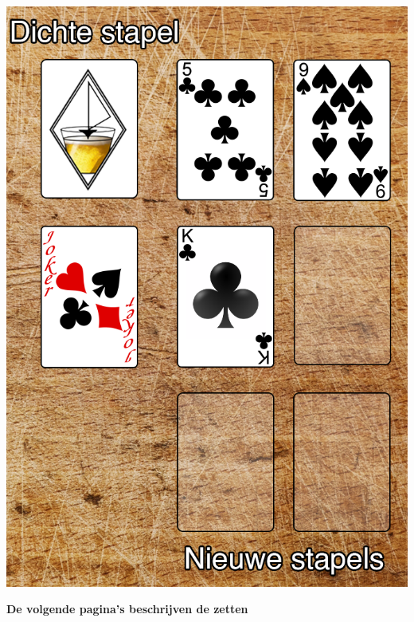 \begin{minipage}[t]{.48\textwidth}
\includegraphics[width=1\textwidth]{img/FritsPlank_Stapels_v2.png}
\end{minipage}
\vspace{1cm}

\centerline{\Large{\textbf{De volgende pagina's beschrijven de zetten}}}